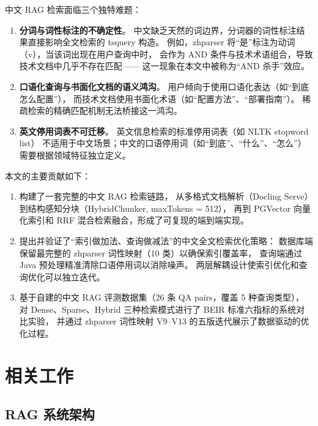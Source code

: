 \documentclass[a4paper, 12pt]{ctexart}
\begin{document}
中文 RAG 检索面临三个独特难题：

\begin{enumerate}
  \item \textbf{分词与词性标注的不确定性}。
  中文缺乏天然的词边界，分词器的词性标注结果直接影响全文检索的 tsquery 构造。
  例如，zhparser 将``是''标注为动词（v），当该词出现在用户查询中时，
  会作为 AND 条件与技术术语组合，导致技术文档中几乎不存在匹配——
  这一现象在本文中被称为``AND 杀手''效应。

  \item \textbf{口语化查询与书面化文档的语义鸿沟}。
  用户倾向于使用口语化表达（如``到底怎么配置''），
  而技术文档使用书面化术语（如``配置方法''、``部署指南''）。
  稀疏检索的精确匹配机制无法桥接这一鸿沟。

  \item \textbf{英文停用词表不可迁移}。
  英文信息检索的标准停用词表（如 NLTK stopword list）
  不适用于中文场景；中文的口语停用词（如``到底''、``什么''、``怎么''）
  需要根据领域特征独立定义。
\end{enumerate}

本文的主要贡献如下：

\begin{enumerate}
  \item 构建了一套完整的中文 RAG 检索链路，
  从多格式文档解析（Docling Serve）到结构感知分块（HybridChunker, maxTokens = 512），
  再到 PGVector 向量化索引和 RRF 混合检索融合，形成了可复现的端到端实现。

  \item 提出并验证了``索引做加法、查询做减法''的中文全文检索优化策略：
  数据库端保留最完整的 zhparser 词性映射（10 类）以确保索引覆盖率，
  查询端通过 Java 预处理精准清除口语停用词以消除噪声。
  两层解耦设计使索引优化和查询优化可以独立迭代。

  \item 基于自建的中文 RAG 评测数据集（26 条 QA pairs，覆盖 5 种查询类型），
  对 Dense、Sparse、Hybrid 三种检索模式进行了 BEIR 标准六指标的系统对比实验，
  并通过 zhparser 词性映射 V9--V13 的五版迭代展示了数据驱动的优化过程。
\end{enumerate}

\section{相关工作}

\subsection{RAG 系统架构}
\end{document}
